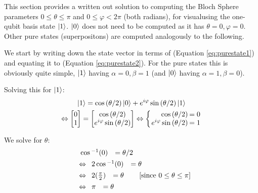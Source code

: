\documentclass[conference]{IEEEtran}
\begin{document}
\begin{appendices}
This section provides a written out solution to computing the Bloch Sphere parameters
$0\le \theta \le \pi$ and $0 \le \varphi < 2 \pi$ (both radians),
 for visualusing the one-qubit basis state $\ket{1}$. $\ket{0}$ does not need to be computed as it has $\theta=0, \varphi=0$.
Other pure states (superpositons) are computed analogously to the following.

We start by writing down the state vector in terms of (Equation \ref{eq:purestate1}) and equating it to (Equation \ref{eq:purestate2}).
For the pure states this is obviously quite simple, $\ket{1}$ having $\alpha=0, \beta=1$ (and $\ket{0}$ having $\alpha=1, \beta=0$).

Solving this for $\ket{1}$:
\begin{multline*}
    \ket{1} = \cos{(\theta/2)}\ket{0} + e^{i\varphi}\sin{(\theta/2)}\ket{1} \\
\begin{split}
\Leftrightarrow
\begin{bmatrix}
    0 \\
    1
\end{bmatrix}
=
\begin{bmatrix}
    \cos{(\theta/2)} \\
    e^{i\varphi}\sin{(\theta/2)}
\end{bmatrix}
& \Leftrightarrow
\setlength\arraycolsep{1pt}
\left\{
\begin{array}{rcrcrc@{\qquad}l}
\cos{(\theta/2)}   &   =  0\\
e^{i\varphi}\sin{(\theta/2)}  &   =  1\\
\end{array}
\right.
\\
\end{split}
\end{multline*}

We solve for $\theta$:
\begin{multline*}
\begin{split}
 \ \ &
\begin{array}{rcrcrc@{\qquad}l}
\cos{^{-1}(0)}   &  = \theta/2\\
\end{array}
\\
& \Leftrightarrow
\begin{array}{rcrcrc@{\qquad}l}
2\cos{^{-1}(0)}   &  = \theta\\
\end{array}
\\
& \Leftrightarrow
\begin{array}{rcrcrc@{\qquad}l}
2(\frac{\pi}{2})   &  = \theta\\
\end{array}
\text{ \ \ \ \ [since } 0\le \theta \le \pi \text{]}
\\
& \Leftrightarrow
\begin{array}{rcrcrc@{\qquad}l}
\pi  &  = \theta\\
\end{array}
\end{split}
\end{multline*}


\end{appendices}
\end{document}
